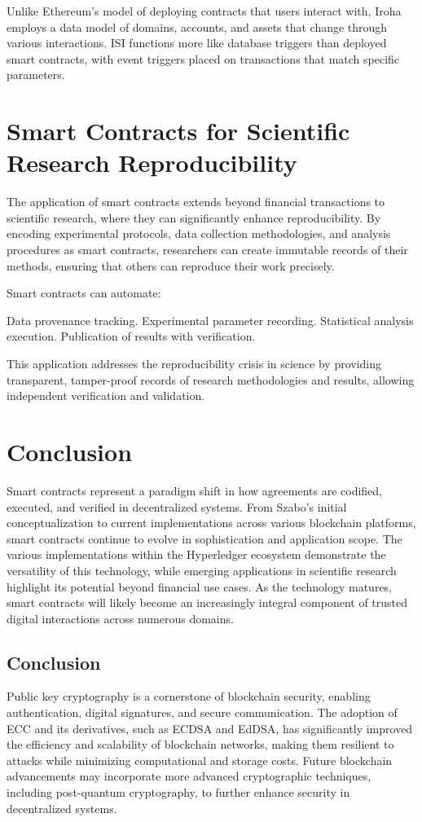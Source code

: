 \documentclass{article}
\begin{document}
Unlike Ethereum's model of deploying contracts that users interact with, Iroha employs a data model of domains, accounts, and assets that change through various interactions. ISI functions more like database triggers than deployed smart contracts, with event triggers placed on transactions that match specific parameters\cite{hyperledger2020iroha}.

\section{Smart Contracts for Scientific Research Reproducibility}

The application of smart contracts extends beyond financial transactions to scientific research, where they can significantly enhance reproducibility. By encoding experimental protocols, data collection methodologies, and analysis procedures as smart contracts, researchers can create immutable records of their methods, ensuring that others can reproduce their work precisely\cite{pilehchiha2022improving}.

Smart contracts can automate:

Data provenance tracking. Experimental parameter recording. Statistical analysis execution. Publication of results with verification.

This application addresses the reproducibility crisis in science by providing transparent, tamper-proof records of research methodologies and results, allowing independent verification and validation.

\section{Conclusion}

Smart contracts represent a paradigm shift in how agreements are codified, executed, and verified in decentralized systems. From Szabo's initial conceptualization to current implementations across various blockchain platforms, smart contracts continue to evolve in sophistication and application scope. The various implementations within the Hyperledger ecosystem demonstrate the versatility of this technology, while emerging applications in scientific research highlight its potential beyond financial use cases. As the technology matures, smart contracts will likely become an increasingly integral component of trusted digital interactions across numerous domains.


\subsection*{Conclusion}
Public key cryptography is a cornerstone of blockchain security, enabling authentication, digital signatures, and secure communication. The adoption of ECC and its derivatives, such as ECDSA and EdDSA, has significantly improved the efficiency and scalability of blockchain networks, making them resilient to attacks while minimizing computational and storage costs. Future blockchain advancements may incorporate more advanced cryptographic techniques, including post-quantum cryptography, to further enhance security in decentralized systems.
\end{document}
